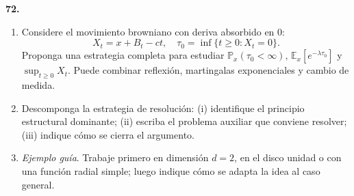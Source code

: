 \documentclass[11pt, letterpaper]{article}
\begin{document}
\newpage

\begin{ejercicio}
    \textbf{72.} 
    \begin{enumerate}
        \item Considere el movimiento browniano con deriva absorbido en 0:
        \[ X_t = x + B_t - ct, \quad \tau_0 = \inf\{t \ge 0 : X_t = 0\}. \]
        Proponga una estrategia completa para estudiar $\mathbb{P}_x(\tau_0 < \infty)$, $\mathbb{E}_x[e^{-\lambda \tau_0}]$ y $\sup_{t \ge 0} X_t$. Puede combinar reflexión, martingalas exponenciales y cambio de medida.
        \item Descomponga la estrategia de resolución: (i) identifique el principio estructural dominante; (ii) escriba el problema auxiliar que conviene resolver; (iii) indique cómo se cierra el argumento.
        \item \textit{Ejemplo guía}. Trabaje primero en dimensión $d=2$, en el disco unidad o con una función radial simple; luego indique cómo se adapta la idea al caso general.
    \end{enumerate}
\end{ejercicio}

\vspace{5mm}
\end{document}

